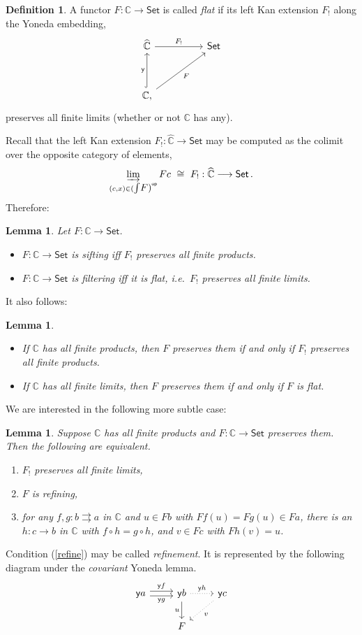 \documentclass[12pt]{article}
\newcommand{\C}{\ensuremath{\mathbb{C}}}
\newcommand{\op}[1]{\ensuremath{{#1}^{\mathsf{op}}}}
\newcommand{\pshat}[1]{\ensuremath{\widehat{#1}}}
\newcommand{\Set}{\ensuremath{\mathsf{Set}}}
\newcommand{\y}{\ensuremath{\mathsf{y}}} %
\newcommand{\elem}[1]{\textstyle\int\!{#1}}%
\newcommand{\colim}{\varinjlim}%
\renewcommand{\to}{\ensuremath{\rightarrow}}
\newcommand{\too}{\ensuremath{\longrightarrow}}
\newtheorem{lemma}[theorem]{Lemma}
\theoremstyle{remark}
\theoremstyle{definition}
\newtheorem{definition}[theorem]{Definition}
\begin{document}
\begin{definition} A functor $F : \C\to\Set$ is called \emph{flat} if its left Kan extension $F_!$ along the Yoneda embedding,
\[
\begin{tikzcd}
\pshat{\C} \ar[rr, "F_!"] && \Set\\  
	 \\
	\C \ar[uu, hook, "\y"] \ar[rruu, swap,"{F}"] ,&&
 \end{tikzcd}
\]
preserves all finite limits (whether or not $\C$ has any).
\end{definition}

Recall that the left Kan extension $F_! : \pshat{\C} \too \Set$ may be computed as the colimit over the opposite  category of elements,
\[
\colim_{ (c,x) \in \op{ (\elem{F}) }} {Fc}\  \cong\  F_! : \pshat{\C} \too \Set\,.
\]
Therefore:
\begin{lemma} Let $F : \C \to \Set$.
\begin{itemize}
\item $F: \C \to \Set$ is sifting iff $F_!$ preserves all finite products.
\item $F: \C \to \Set$ is filtering iff it is flat, i.e.\  $F_!$ preserves all finite limits.
\end{itemize}
\end{lemma}

It also follows:

\begin{lemma}
\begin{itemize}
\item If $\C$ has all finite products, then $F$ preserves them if and only if $F_!$ preserves all finite products.
\item If $\C$ has all finite limits, then $F$ preserves them if and only if $F$ is flat.
\end{itemize}
\end{lemma}

We are interested in the following more subtle case:

\begin{lemma}\label{lemma:refinement} Suppose $\C$ has all finite products and $F : \C\to\Set$ preserves them. Then the following are equivalent.
\begin{enumerate}
\item $F_!$ preserves all finite limits,
\item $F$ is refining,
\item\label{refine} for any $f, g : b\rightrightarrows a$ in $\C$ and $u \in Fb$ with $Ff(u) = Fg(u) \in Fa$, there is an $h : c\to b$ in $\C$ with $f\circ h = g\circ h$, and $v \in Fc$ with $Fh(v) = u$.  
\end{enumerate}
\end{lemma}
%
Condition (\ref{refine}) may be called \emph{refinement}. It is represented by the following diagram under the \emph{covariant} Yoneda lemma.
\[
\begin{tikzcd}
\y{a} \ar[r, shift right, swap, "\y{g}"] \ar[r, shift left, "\y{f}"] & \y{b} \ar[d,swap, "u"]  \ar[r, dotted, "\y{h}"] & \ar[ld, dotted, "v"] \y{c} \\  
	& F &
 \end{tikzcd}
 \]
\end{document}
